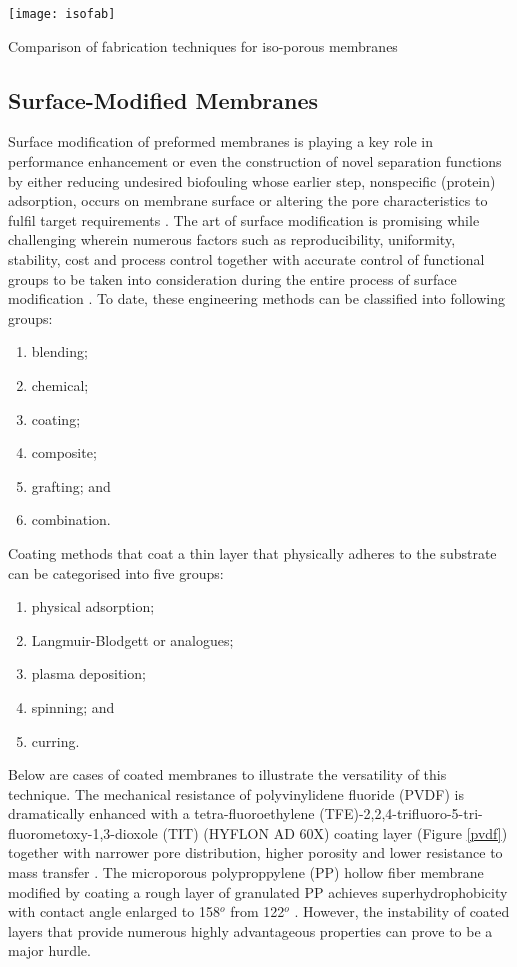 \documentclass[a4paper,12pt]{report}
\begin{document}
\begin{table}[h!]  
\texttt{[image: isofab]}
  \caption{Comparison of fabrication techniques for iso-porous membranes}
  \label{isoporous}
\end{table}

\subsection{Surface-Modified Membranes}

Surface modification of preformed membranes is playing a key role in performance enhancement or even the construction of novel separation functions by either reducing undesired biofouling whose earlier step, nonspecific (protein) adsorption, occurs on membrane surface \citep{75cnad} or altering the pore characteristics to fulfil target requirements \citep{74set}. The art of surface modification is promising while challenging wherein numerous factors such as reproducibility, uniformity, stability, cost and process control together with accurate control of functional groups to be taken into consideration during the entire process of surface modification \citep{07gop}. To date, these engineering methods can be classified into following groups: 
\begin{enumerate}
\item blending;
\item chemical; 
\item coating; 
\item composite; 
\item grafting; and 
\item combination.
\end{enumerate}

Coating methods that coat a thin layer that physically adheres to the substrate can be categorised into five groups: 
\begin{enumerate}
\item physical adsorption; 
\item Langmuir-Blodgett or analogues; 
\item plasma deposition; 
\item spinning; and 
\item curring. 
\end{enumerate}

Below are cases of coated membranes to illustrate the versatility of this technique. The mechanical resistance of polyvinylidene fluoride (PVDF) is dramatically enhanced with a tetra-fluoroethylene (TFE)-2,2,4-trifluoro-5-tri-fluorometoxy-1,3-dioxole (TIT) (HYFLON AD 60X) coating layer (Figure \ref{pvdf}) together with narrower pore distribution, higher porosity and lower resistance to mass transfer \citep{90gug}. The microporous polyproppylene (PP) hollow fiber membrane modified by coating a rough layer of granulated PP achieves superhydrophobicity with contact angle enlarged to 158$^o$ from 122$^o$ \citep{91lv}. However, the instability of coated layers that provide numerous highly advantageous properties can prove to be a major hurdle.
\end{document}
